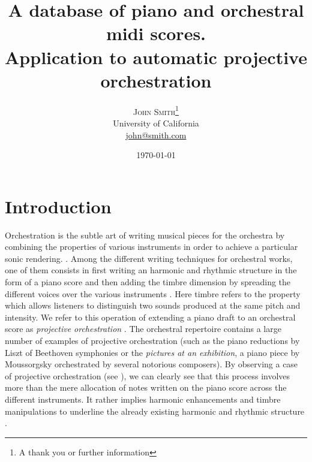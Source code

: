 \documentclass[twoside,twocolumn]{article}
\title{A database of piano and orchestral midi scores.\\Application to automatic projective orchestration} %
\author{%
\textsc{John Smith}\thanks{A thank you or further information} \\[1ex] %
\normalsize University of California \\ %
\normalsize \href{mailto:john@smith.com}{john@smith.com} %
}
\date{\today} %
\begin{document}
\maketitle


\section{Introduction}
Orchestration is the subtle art of writing musical pieces for the orchestra by combining the properties of various instruments in order to achieve a particular sonic rendering. \cite{koechli_orch,Rimsky-Korsakov:1873aa}.
Among the different writing techniques for orchestral works, one of them consists in first writing an harmonic and rhythmic structure in the form of a piano score and then adding the timbre dimension by spreading the different voices over the various instruments \cite{piston-orch}. 
Here timbre refers to the property which allows listeners to distinguish two sounds produced at the same pitch and intensity. 
We refer to this operation of extending a piano draft to an orchestral score as \textit{projective orchestration} \cite{eslingthesis}.
The orchestral repertoire contains a large number of examples of projective orchestration (such as the piano reductions by Liszt of Beethoven symphonies or the \textit{pictures at an exhibition}, a piano piece by Moussorgsky orchestrated by several notorious composers). By observing a case of projective orchestration (see ), we can clearly see that this process involves more than the mere allocation of notes written on the piano score across the different instruments. It rather implies harmonic enhancements and timbre manipulations to underline the already existing harmonic and rhythmic structure \cite{mcadams2013timbre}.
\end{document}
